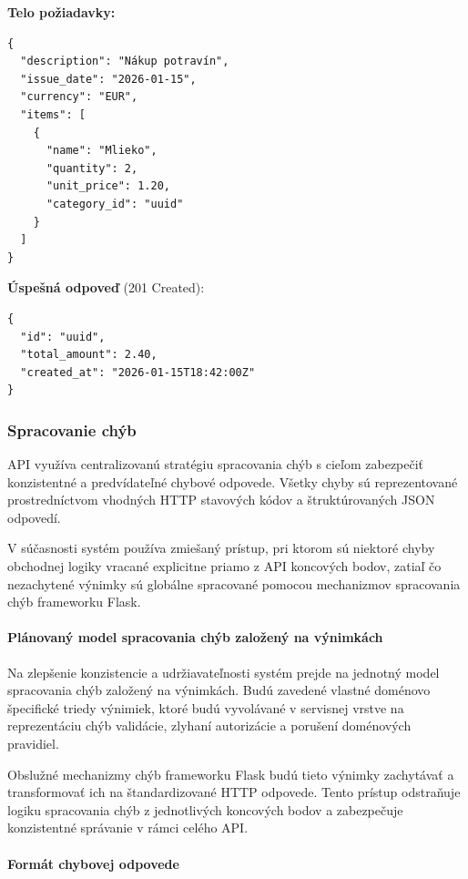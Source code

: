 \noindent\textbf{Telo požiadavky:}
\begin{verbatim}
{
  "description": "Nákup potravín",
  "issue_date": "2026-01-15",
  "currency": "EUR",
  "items": [
    {
      "name": "Mlieko",
      "quantity": 2,
      "unit_price": 1.20,
      "category_id": "uuid"
    }
  ]
}
\end{verbatim}

\noindent\textbf{Úspešná odpoveď} (201 Created):
\begin{verbatim}
{
  "id": "uuid",
  "total_amount": 2.40,
  "created_at": "2026-01-15T18:42:00Z"
}
\end{verbatim}

\subsubsection{Spracovanie chýb}

API využíva centralizovanú stratégiu spracovania chýb s cieľom zabezpečiť konzistentné a predvídateľné chybové odpovede. Všetky chyby sú reprezentované prostredníctvom vhodných HTTP stavových kódov a štruktúrovaných JSON odpovedí.

V súčasnosti systém používa zmiešaný prístup, pri ktorom sú niektoré chyby obchodnej logiky vracané explicitne priamo z API koncových bodov, zatiaľ čo nezachytené výnimky sú globálne spracované pomocou mechanizmov spracovania chýb frameworku Flask.

\paragraph{Plánovaný model spracovania chýb založený na výnimkách}

Na zlepšenie konzistencie a udržiavateľnosti systém prejde na jednotný model spracovania chýb založený na výnimkách. Budú zavedené vlastné doménovo špecifické triedy výnimiek, ktoré budú vyvolávané v servisnej vrstve na reprezentáciu chýb validácie, zlyhaní autorizácie a porušení doménových pravidiel.

Obslužné mechanizmy chýb frameworku Flask budú tieto výnimky zachytávať a transformovať ich na štandardizované HTTP odpovede. Tento prístup odstraňuje logiku spracovania chýb z jednotlivých koncových bodov a zabezpečuje konzistentné správanie v rámci celého API.

\paragraph{Formát chybovej odpovede}

